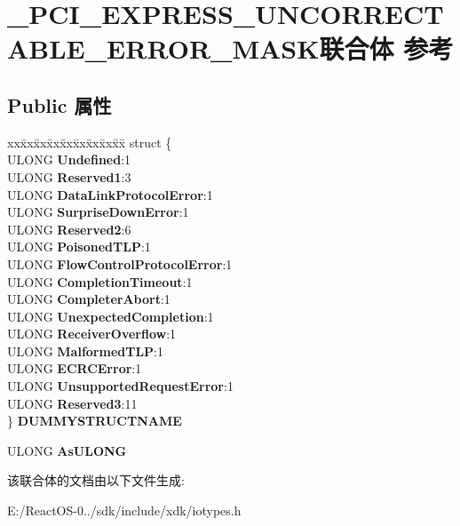 \hypertarget{union___p_c_i___e_x_p_r_e_s_s___u_n_c_o_r_r_e_c_t_a_b_l_e___e_r_r_o_r___m_a_s_k}{}\section{\+\_\+\+P\+C\+I\+\_\+\+E\+X\+P\+R\+E\+S\+S\+\_\+\+U\+N\+C\+O\+R\+R\+E\+C\+T\+A\+B\+L\+E\+\_\+\+E\+R\+R\+O\+R\+\_\+\+M\+A\+S\+K联合体 参考}
\label{union___p_c_i___e_x_p_r_e_s_s___u_n_c_o_r_r_e_c_t_a_b_l_e___e_r_r_o_r___m_a_s_k}
\subsection*{Public 属性}
\begin{DoxyCompactItemize}
\item 
\mbox{\label{union___p_c_i___e_x_p_r_e_s_s___u_n_c_o_r_r_e_c_t_a_b_l_e___e_r_r_o_r___m_a_s_k_a5bfcdae2354fc8084525fe9ef3b47c3c}} 
\begin{tabbing}
xx\=xx\=xx\=xx\=xx\=xx\=xx\=xx\=xx\=\kill
struct \{\\
\>ULONG {\bfseries Undefined}:1\\
\>ULONG {\bfseries Reserved1}:3\\
\>ULONG {\bfseries DataLinkProtocolError}:1\\
\>ULONG {\bfseries SurpriseDownError}:1\\
\>ULONG {\bfseries Reserved2}:6\\
\>ULONG {\bfseries PoisonedTLP}:1\\
\>ULONG {\bfseries FlowControlProtocolError}:1\\
\>ULONG {\bfseries CompletionTimeout}:1\\
\>ULONG {\bfseries CompleterAbort}:1\\
\>ULONG {\bfseries UnexpectedCompletion}:1\\
\>ULONG {\bfseries ReceiverOverflow}:1\\
\>ULONG {\bfseries MalformedTLP}:1\\
\>ULONG {\bfseries ECRCError}:1\\
\>ULONG {\bfseries UnsupportedRequestError}:1\\
\>ULONG {\bfseries Reserved3}:11\\
\} {\bfseries DUMMYSTRUCTNAME}\\

\end{tabbing}\item 
\mbox{\label{union___p_c_i___e_x_p_r_e_s_s___u_n_c_o_r_r_e_c_t_a_b_l_e___e_r_r_o_r___m_a_s_k_ad2ae8be77e4c0c56b53360ee0a86d928}} 
U\+L\+O\+NG {\bfseries As\+U\+L\+O\+NG}
\end{DoxyCompactItemize}


该联合体的文档由以下文件生成\+:\begin{DoxyCompactItemize}
\item 
E\+:/\+React\+O\+S-\/0../sdk/include/xdk/iotypes.\+h\end{DoxyCompactItemize}
